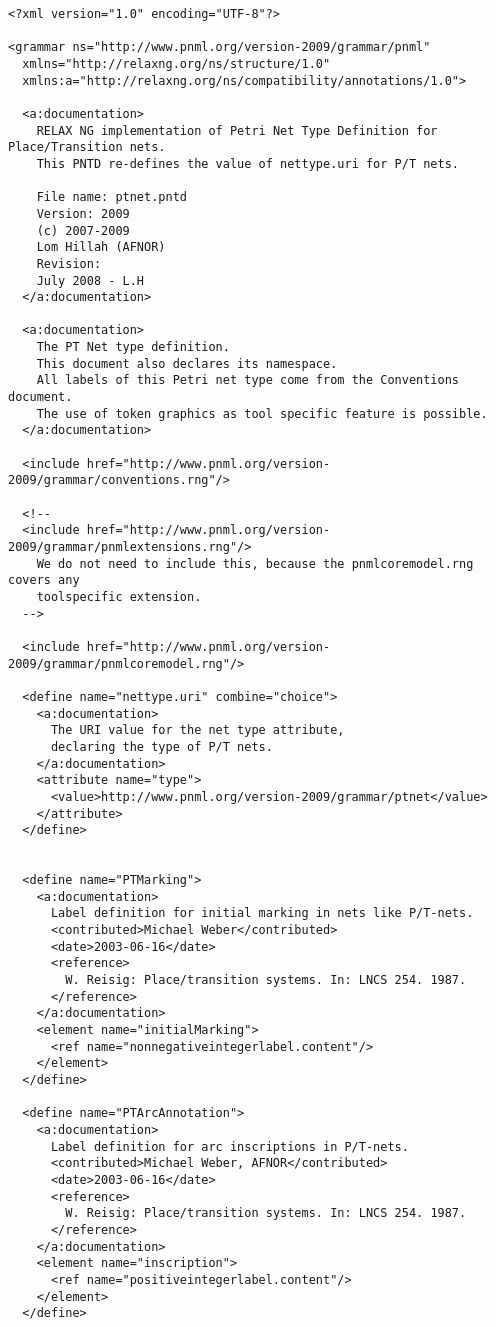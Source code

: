 \begin{lstlisting}[label=grammar_place_transitions,caption=RELAX NG implementation of PNTD for Place/Transition nets]
<?xml version="1.0" encoding="UTF-8"?>

<grammar ns="http://www.pnml.org/version-2009/grammar/pnml"
  xmlns="http://relaxng.org/ns/structure/1.0"
  xmlns:a="http://relaxng.org/ns/compatibility/annotations/1.0"> 

  <a:documentation>
    RELAX NG implementation of Petri Net Type Definition for Place/Transition nets.
    This PNTD re-defines the value of nettype.uri for P/T nets.
    
    File name: ptnet.pntd
    Version: 2009
    (c) 2007-2009
    Lom Hillah (AFNOR)
    Revision:
    July 2008 - L.H
  </a:documentation>

  <a:documentation>
    The PT Net type definition.
    This document also declares its namespace.
    All labels of this Petri net type come from the Conventions document.
    The use of token graphics as tool specific feature is possible.
  </a:documentation>

  <include href="http://www.pnml.org/version-2009/grammar/conventions.rng"/>
  
  <!--
  <include href="http://www.pnml.org/version-2009/grammar/pnmlextensions.rng"/>
    We do not need to include this, because the pnmlcoremodel.rng covers any
    toolspecific extension.
  -->
  
  <include href="http://www.pnml.org/version-2009/grammar/pnmlcoremodel.rng"/>
  
  <define name="nettype.uri" combine="choice">
    <a:documentation>
      The URI value for the net type attribute, 
      declaring the type of P/T nets.
    </a:documentation>
    <attribute name="type">    
      <value>http://www.pnml.org/version-2009/grammar/ptnet</value>   
    </attribute>
  </define>

  
  <define name="PTMarking">
    <a:documentation>
      Label definition for initial marking in nets like P/T-nets.
      <contributed>Michael Weber</contributed>
      <date>2003-06-16</date>
      <reference>
        W. Reisig: Place/transition systems. In: LNCS 254. 1987.
      </reference>
    </a:documentation>
    <element name="initialMarking">
      <ref name="nonnegativeintegerlabel.content"/>
    </element>
  </define>

  <define name="PTArcAnnotation">
    <a:documentation>
      Label definition for arc inscriptions in P/T-nets.
      <contributed>Michael Weber, AFNOR</contributed>
      <date>2003-06-16</date>
      <reference>
        W. Reisig: Place/transition systems. In: LNCS 254. 1987.
      </reference>
    </a:documentation>
    <element name="inscription">
      <ref name="positiveintegerlabel.content"/>
    </element>
  </define>


\end{lstlisting}
